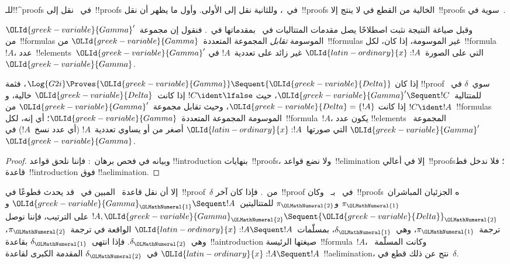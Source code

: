 \documentclass[../../../include/open-logic-section]{subfiles}
\begin{document}


للـ!!^{proof}s في~ نقل إلى~!!{proof}s في~، وللثانية
نقل إلى الأولى. وأول ما يظهر أن نقل~!!{proof}s الخالية من القطع في
 لا ينتج إلا~!!{proof}s سوية في~.

وقبل صياغة النتيجة نثبت اصطلاحًا يصل مقدمات المتتاليات في~
بمقدماتها في~. فنقول إن مجموعة~${\OLId{greek-variable}{Gamma}}'$ من~!!{formula}s
الموسومة \emph{تقابل} المجموعة المتعددة~${\OLId{greek-variable}{Gamma}}$ من~!!{formula}s غير
الموسومة، إذا كان، لكل~!!{formula}~$!A$، عدد~!!{element}s~${\OLId{greek-variable}{Gamma}}'$ التي
على الصورة~${\OLId{latin-ordinary}{x}}:!A$ غير زائد على تعددية~$!A$ في~${\OLId{greek-variable}{Gamma}}$.

\begin{cor}
إذا كان $\Log{G2i} \Proves {\OLId{greek-variable}{Gamma}} \Sequent {\OLId{greek-variable}{Delta}}$، فثمة
!!{proof} سوي~$\delta$ في~ للمتتالية~${\OLId{greek-variable}{Gamma}}' \Sequent !C$، حيث
$!C\ident\lfalse$ إذا كانت~${\OLId{greek-variable}{Delta}}$ خالية، و$!C\ident !A$ إذا كانت
${\OLId{greek-variable}{Delta}}=\{!A\}$، وحيث تقابل مجموعة~${\OLId{greek-variable}{Gamma}}'$ من~!!{formula}s الموسومة
المجموعة المتعددة~${\OLId{greek-variable}{Gamma}}$؛ أي إنه، لكل~!!{formula}~$!A$، يكون عدد
!!{element}s المجموعة~${\OLId{greek-variable}{Gamma}}'$ التي صورتها~${\OLId{latin-ordinary}{x}}:!A$ أصغر من أو يساوي
تعددية~$!A$ (أي عدد نسخ~$!A$) في~${\OLId{greek-variable}{Gamma}}$.
\end{cor}

\begin{proof}
وبيانه في فحص برهان~: فإننا نلحق قواعد
!!{introduction} بنهايات~!!{proof}s، ولا نضع قواعد~!!{elimination} إلا
في أعالي~!!{proof}s؛ فلا ندخل قط قاعدة~!!{introduction} فوق
!!a{elimination}.
\end{proof}

إلا أن نقل قاعدة~\Cut{} المبين في~
قد يحدث قطوعًا في~!!{proof}~$\delta$ من~. فإذا كان آخر~!!{proof}
في~ بـ~\Cut{} وكان~!!{proof}sه الجزئيان المباشران~$\pi_{\OLMathNumeral{1}}$ و$\pi_{\OLMathNumeral{2}}$
للمتتاليتين~${\OLId{greek-variable}{Gamma}}_{\OLMathNumeral{1}} \Sequent !A$ و
$!A,{\OLId{greek-variable}{Gamma}}_{\OLMathNumeral{2}} \Sequent {\OLId{greek-variable}{Delta}}_{\OLMathNumeral{2}}$ على الترتيب، فإننا نوصل ترجمة~$\pi_{\OLMathNumeral{1}}$،
وهي~$\delta_{\OLMathNumeral{1}}$، بمسلّمات~${\OLId{latin-ordinary}{x}}:!A \Sequent !A$ الواقعة في ترجمة~$\pi_{\OLMathNumeral{2}}$،
وهي~$\delta_{\OLMathNumeral{2}}$. فإذا انتهى~$\delta_{\OLMathNumeral{1}}$ بقاعدة~!!a{introduction} صيغتها
الرئيسة~!!{formula}~$!A$، وكانت المسلّمة~${\OLId{latin-ordinary}{x}}:!A \Sequent !A$ في~$\delta_{\OLMathNumeral{2}}$
المقدمة الكبرى لقاعدة~!!a{elimination}، نتج عن ذلك قطع في~$\delta$.
\end{document}

